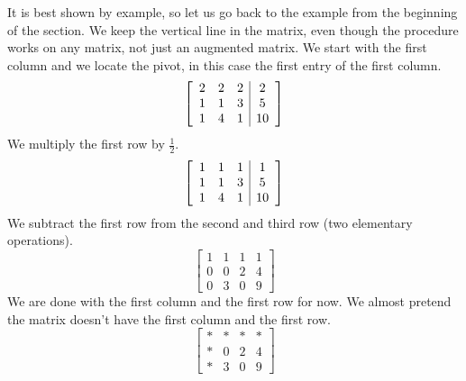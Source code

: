 \documentclass{ximera}
\begin{document}
It is best shown by example, so let us go back to the example from the beginning of the section. We keep the vertical line in the matrix, even though the procedure works on any matrix, not just an augmented matrix. We start with the first column and we locate the pivot, in this case the first entry of the first column.
\begin{equation*}
    \left[
        \begin{array}{ccc|c}
            2 & 2 & 2 & 2 \\
            1 & 1 & 3 & 5 \\
            1 & 4 & 1 & 10
        \end{array}
    \right]
\end{equation*}
We multiply the first row by $\frac{1}{2}$.
\begin{equation*}
    \left[
        \begin{array}{ccc|c}
            1 & 1 & 1 & 1 \\
            1 & 1 & 3 & 5 \\
            1 & 4 & 1 & 10
        \end{array}
    \right]
\end{equation*}
We subtract the first row from the second and third row (two elementary operations).
\begin{equation*}
    \left[
        \begin{array}{ccc|c}
            1 & 1 & 1 & 1 \\
            0 & 0 & 2 & 4 \\
            0 & 3 & 0 & 9
        \end{array}
    \right]
\end{equation*}
We are done with the first column and the first row for now.  We almost pretend the matrix doesn't have the first column and the first row.
\begin{equation*}
    \left[
        \begin{array}{ccc|c}
            * & * & * & * \\
            * & 0 & 2 & 4 \\
            * & 3 & 0 & 9
        \end{array}
    \right]
\end{equation*}
\end{document}
